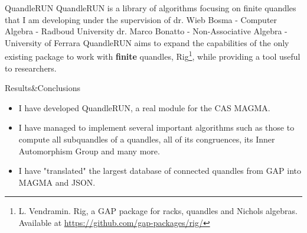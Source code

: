  \begin{frame}{QuandleRUN}
QuandleRUN is a library of algorithms focusing on finite quandles that I am developing under the supervision of\newline\newline
dr. Wieb Bosma - Computer Algebra - Radboud University \newline
dr. Marco Bonatto - Non-Associative Algebra - University of Ferrara\newline\newline
QuandleRUN aims to expand the capabilities of the only existing package to work with \textbf{finite} quandles, Rig\footnote{L. Vendramin. Rig, a GAP package for racks, quandles and Nichols algebras. Available at \href{https://github.com/gap-packages/rig/}{https://github.com/gap-packages/rig/} \newline}, while providing a tool useful to researchers.  
\end{frame} 







\begin{frame}{Results\&Conclusions}
    \begin{itemize}
        \item I have developed QuandleRUN, a real module for the CAS \textsc{MAGMA}.
        \item I have managed to implement several important algorithms such as those to compute all subquandles of a quandles, all of its congruences, its Inner Automorphism Group and many more. 
        \item I have "translated" the largest database of connected quandles from \textsc{GAP} into \textsc{MAGMA} and JSON.
        
        
        
    \end{itemize}
    
\end{frame}


